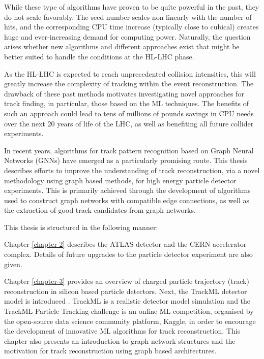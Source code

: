 While these type of algorithms have proven to be quite powerful in the past, they do not scale favorably. The seed number scales non-linearly with the number of hits, and the corresponding CPU time increase (typically close to cubical) creates huge and ever-increasing demand for computing power. Naturally, the question arises whether new algorithms and different approaches exist that might be better suited to handle the conditions at the \ac{HL-LHC} phase.

As the \ac{HL-LHC} is expected to reach unprecedented collision intensities, this will greatly increase the complexity of tracking within the event reconstruction. The drawback of these past methods motivates investigating novel approaches for track finding, in particular, those based on the \ac{ML} techniques. The benefits of such an approach could lead to tens of millions of pounds savings in CPU needs over the next 20 years of life of the \ac{LHC}, as well as benefiting all future collider experiments.

In recent years, algorithms for track pattern recognition based on Graph Neural Networks (GNNs) have emerged as a particularly promising route. This thesis describes efforts to improve the understanding of track reconstruction, via a novel methodology using graph based methods, for high energy particle detector experiments. This is primarily achieved through the development of algorithms used to construct graph networks with compatible edge connections, as well as the extraction of good track candidates from graph networks. 

This thesis is structured in the following manner:

Chapter \ref{chapter-2} describes the ATLAS detector and the CERN accelerator complex. Details of future upgrades to the particle detector experiment are also given.

Chapter \ref{chapter-3} provides an overview of charged particle trajectory (track) reconstruction in silicon based particle detectors. Next, the TrackML detector model is introduced \cite{kaggle-trackml}. TrackML is a realistic detector model simulation and the TrackML Particle Tracking challenge is an online \ac{ML} competition, organised by the open-source data science community platform, Kaggle, in order to encourage the development of innovative \ac{ML} algorithms for track reconstruction. This chapter also presents an introduction to graph network structures and the motivation for track reconstruction using graph based architectures.

